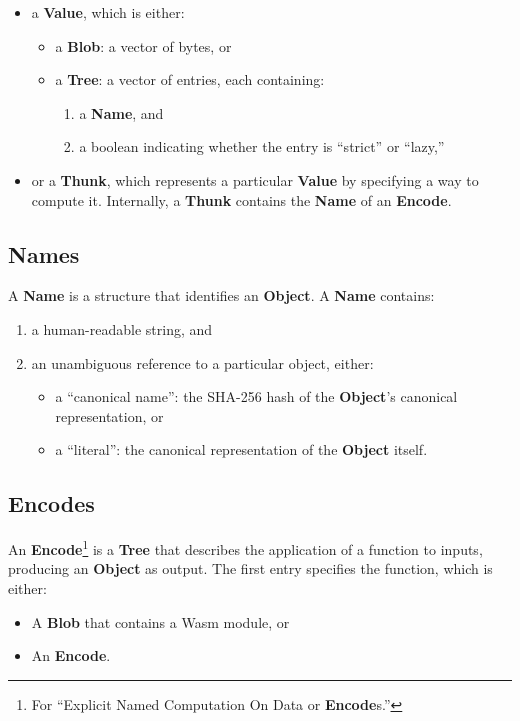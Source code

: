 \documentclass{article}
\newcommand{\blob}{\textbf{Blob}\xspace}
\newcommand{\valuex}{\textbf{Value}\xspace}
\newcommand{\object}{\textbf{Object}\xspace}
\newcommand{\encode}{\textbf{Encode}\xspace}
\newcommand{\thunk}{\textbf{Thunk}\xspace}
\newcommand{\encodes}{\textbf{Encode}s\xspace}
\newcommand{\name}{\textbf{Name}\xspace}
\newcommand{\names}{\textbf{Name}s\xspace}
\newcommand{\tree}{\textbf{Tree}\xspace}
\begin{document}
\begin{itemize}[itemsep=0pt]
\item a \valuex, which is either:
\begin{itemize}[itemsep=0pt]
  \item a \blob: a vector of bytes, or

  \item a \tree: a vector of entries, each containing:

    \begin{enumerate}[topsep=0pt, itemsep=0pt]
    \item a \name, and

    \item a boolean indicating whether the entry is ``strict'' or ``lazy,''
    \end{enumerate}
\end{itemize}

\item or a \thunk, which represents a particular \valuex by specifying
  a way to compute it. Internally, a \thunk contains the \name of an \encode.
\end{itemize}
  
\subsection{\names}

A \name is a structure that identifies an \object. A \name contains:
\begin{enumerate}[itemsep=0pt]
  \item a human-readable string, and
  \item an unambiguous reference to a particular object, either:
    \begin{itemize}[itemsep=0pt]
    \item a ``canonical name'': the {\textsc SHA-256} hash of the \object's canonical representation, or
    \item a ``literal'': the canonical representation of the \object itself.
    \end{itemize}
\end{enumerate}

\enlargethispage{3\baselineskip}

\subsection{\encodes}

An \encode\footnote{For ``Explicit Named Computation On Data or
\encodes.''} is a \tree that describes the application of a function
to inputs, producing an \object as output. The first entry specifies the
function, which is either:
\begin{itemize}[itemsep=0pt]
\item A \blob that contains a Wasm module, or
\item An \encode.
\end{itemize}
\end{document}
